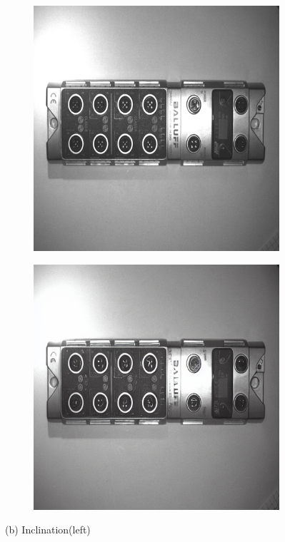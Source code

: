 \documentclass[12pt,DIV14,BCOR12mm,a4paper,footinclude=false,headinclude,parskip=half-,twoside,openright,cleardoublepage=empty,toc=index,bibliography=totoc,listof=totoc]{scrreprt}
\numberwithin{equation}{chapter}
\begin{document}
\begin{figure}
    \begin{subfigure}[t]{0.24\textwidth}
        \centering
        \includegraphics[width=\textwidth]{../media/diff_bni_left_real.png}
    \end{subfigure}%
    \hspace{0.02\textwidth}
    \begin{subfigure}[t]{0.24\textwidth}
        \centering
        \includegraphics[width=\textwidth]{../media/diff_bni_left_fake.png}
    \end{subfigure}
    \caption*{(b) Inclination(left)}


\end{figure}
\end{document}

